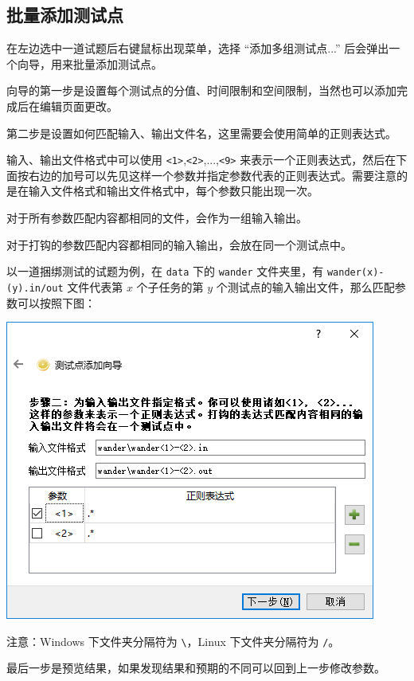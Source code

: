 \documentclass[12pt, a4paper]{article}
\begin{document}
\subsection{批量添加测试点}

在左边选中一道试题后右键鼠标出现菜单，选择 “添加多组测试点...” 后会弹出一个向导，用来批量添加测试点。

向导的第一步是设置每个测试点的分值、时间限制和空间限制，当然也可以添加完成后在编辑页面更改。

第二步是设置如何匹配输入、输出文件名，这里需要会使用简单的正则表达式。

输入、输出文件格式中可以使用 \texttt{<1>},\texttt{<2>},...,\texttt{<9>} 来表示一个正则表达式，然后在下面按右边的加号可以先见这样一个参数并指定参数代表的正则表达式。需要注意的是在输入文件格式和输出文件格式中，每个参数只能出现一次。

对于所有参数匹配内容都相同的文件，会作为一组输入输出。

对于打钩的参数匹配内容都相同的输入输出，会放在同一个测试点中。

以一道捆绑测试的试题为例，在 \texttt{data} 下的 \texttt{wander} 文件夹里，有 \texttt{wander(x)-(y).in/out} 文件代表第 $x$ 个子任务的第 $y$ 个测试点的输入输出文件，那么匹配参数可以按照下图：

\begin{center}
\includegraphics[scale=0.6]{pic/addtestcases.png}
\end{center}

注意：Windows 下文件夹分隔符为 \texttt{\textbackslash}，Linux 下文件夹分隔符为 \texttt{/}。

最后一步是预览结果，如果发现结果和预期的不同可以回到上一步修改参数。
\end{document}
